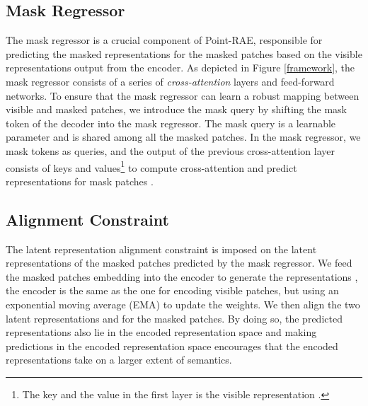 \documentclass[sigconf, screen]{acmart}
\begin{document}
\subsection{Mask Regressor}
The mask regressor is a crucial component of Point-RAE, responsible for predicting the masked representations  for the masked patches based on the visible representations  output from the encoder.
As depicted in Figure \ref{framework}, the mask regressor consists of a series of \textit{cross-attention} layers and feed-forward networks.
To ensure that the mask regressor can learn a robust mapping between visible and masked patches, we introduce the mask query by shifting the mask token of the decoder into the mask regressor. The mask query is a learnable parameter and is shared among all the masked patches. 
In the mask regressor, we mask tokens as queries, and the output of the previous cross-attention layer consists of keys and values\footnote{The key and the value in the first layer is the visible representation .} to compute cross-attention and predict representations for mask patches .

\subsection{Alignment Constraint}
The latent representation alignment constraint is imposed on the latent representations  of the masked patches predicted by the mask regressor. 
We feed the masked patches embedding  into the encoder to generate the representations , the encoder is the same as the one for encoding visible patches, but using an exponential moving average (EMA) to update the weights.
We then align the two latent representations  and  for the masked patches.
By doing so, the predicted representations also lie in the encoded representation space and making predictions in the encoded representation space encourages that the encoded representations take on a larger extent of semantics.
\end{document}
